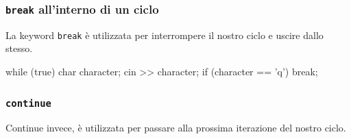 \documentclass[handout]{beamer}
\begin{document}
    \begin{frame}[fragile]
        \frametitle{\texttt{break} all'interno di un ciclo}
        La keyword \texttt{break} è utilizzata per interrompere il nostro ciclo e uscire dallo stesso.
        \begin{cppcode}
            while (true) {
                char character;
                cin >> character;
                if (character == 'q') {
                    break;
                }
            }
        \end{cppcode}
    \end{frame}

    \begin{frame}[fragile]
        \frametitle{\texttt{continue}}
        Continue invece, è utilizzata per passare alla prossima iterazione del nostro ciclo.
    \end{frame}
\end{document}
